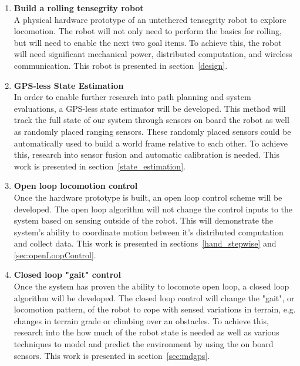 \begin{enumerate}[leftmargin=.5cm]
\item \textbf{Build a rolling tensegrity robot}\\
A physical hardware prototype of an untethered tensegrity robot to explore locomotion.
The robot will not only need to perform the basics for rolling, but will need to enable the next two goal items.
To achieve this, the robot will need significant mechanical power, distributed computation, and wireless communication.
This robot is presented in section~\ref{design}.

\item \textbf{GPS-less State Estimation}\\
In order to enable further research into path planning and system evaluations, a GPS-less state estimator will be developed.
This method will track the full state of our system through sensors on board the robot as well as randomly placed ranging sensors.
These randomly placed sensors could be automatically used to build a world frame relative to each other.
To achieve this, research  into sensor fusion and automatic calibration is needed.
This work is presented in section~\ref{state_estimation}.

\item \textbf{Open loop locomotion control}\\
Once the hardware prototype is built, an open loop control scheme will be developed.
The open loop algorithm will not change the control inputs to the system based on sensing outside of the robot.
This will demonstrate the system's ability to coordinate motion between it's distributed computation and collect data.
This work is presented in sections~\ref{hand_stepwise} and \ref{sec:openLoopControl}.

\item \textbf{Closed loop "gait" control}\\
Once the system has proven the ability to locomote open loop, a closed loop algorithm will be developed.
The closed loop control will change the "gait", or locomotion pattern, of the robot to cope with sensed variations in terrain, e.g. changes in terrain grade or climbing over an obstacles.
To achieve this, research into the how much of the robot state is needed as well as various techniques to model and predict the environment by using the on board sensors.
This work is presented in section~\ref{sec:mdgps}.
\end{enumerate}
